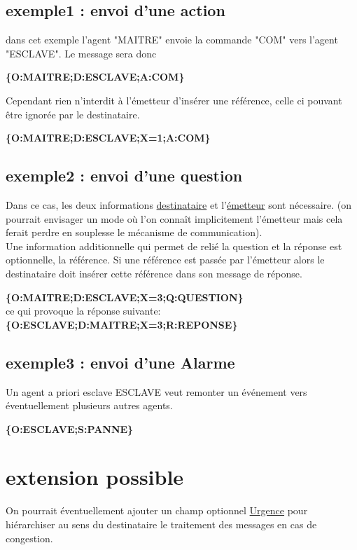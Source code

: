 \documentclass[french]{article}
\begin{document}
\subsection{exemple1 : envoi d'une action}
dans cet exemple l'agent "MAITRE" envoie la commande "COM" vers l'agent "ESCLAVE". Le message sera donc\\
\begin{center}
\textbf{\{O:MAITRE;D:ESCLAVE;A:COM\}}
\end{center}
Cependant rien n'interdit à l'émetteur d'insérer une référence, celle ci pouvant être ignorée par le destinataire.
\begin{center}
	\textbf{\{O:MAITRE;D:ESCLAVE;X=1;A:COM\}}
\end{center}
\subsection{exemple2 : envoi d'une question}
Dans ce cas, les deux informations \underline{destinataire} et l’\underline{émetteur} sont nécessaire. (on pourrait envisager un mode où l’on connaît implicitement l’émetteur mais cela ferait perdre en souplesse
le mécanisme de communication).\\
Une information additionnelle qui permet de relié la question et la réponse est optionnelle, la référence. Si une référence est passée par l’émetteur alors le destinataire doit insérer cette
référence dans son message de réponse.
\begin{center}
	\textbf{\{O:MAITRE;D:ESCLAVE;X=3;Q:QUESTION\}}\\
	ce qui provoque la réponse suivante:\\
	\textbf{\{O:ESCLAVE;D:MAITRE;X=3;R:REPONSE\}}
\end{center}
\subsection{exemple3 : envoi d'une Alarme}
Un agent a priori esclave ESCLAVE veut remonter un événement vers éventuellement plusieurs autres agents.
\begin{center}
	\textbf{\{O:ESCLAVE;S:PANNE\}}
\end{center}
\section{extension possible}
On pourrait éventuellement ajouter un champ optionnel \underline{Urgence} pour hiérarchiser au sens du destinataire le traitement des messages en cas de congestion. 
\end{document}
